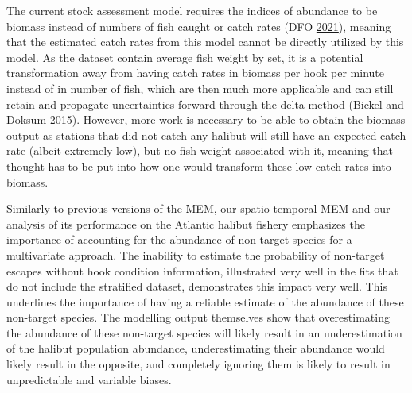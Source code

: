 \documentclass[12pt]{article}\usepackage[]{graphicx}\usepackage[]{color}
\begin{document}
The current stock assessment model requires the indices of abundance to be biomass instead of numbers of fish caught or catch rates (DFO \protect\hyperlink{ref-DFO2021}{2021}), meaning that the estimated catch rates from this model cannot be directly utilized by this model. As the dataset contain average fish weight by set, it is a potential transformation away from having catch rates in biomass per hook per minute instead of in number of fish, which are then much more applicable and can still retain and propagate uncertainties forward through the delta method (Bickel and Doksum \protect\hyperlink{ref-Bickel2015}{2015}). However, more work is necessary to be able to obtain the biomass output as stations that did not catch any halibut will still have an expected catch rate (albeit extremely low), but no fish weight associated with it, meaning that thought has to be put into how one would transform these low catch rates into biomass.

Similarly to previous versions of the MEM, our spatio-temporal MEM and our analysis of its performance on the Atlantic halibut fishery emphasizes the importance of accounting for the abundance of non-target species for a multivariate approach. The inability to estimate the probability of non-target escapes without hook condition information, illustrated very well in the fits that do not include the stratified dataset, demonstrates this impact very well. This underlines the importance of having a reliable estimate of the abundance of these non-target species. The modelling output themselves show that overestimating the abundance of these non-target species will likely result in an underestimation of the halibut population abundance, underestimating their abundance would likely result in the opposite, and completely ignoring them is likely to result in unpredictable and variable biases.
\end{document}
